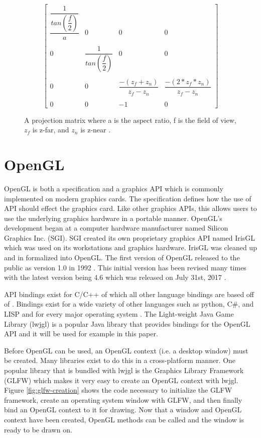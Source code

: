\documentclass{article}
\begin{document}
\begin{figure}[h]
    \[
	  \begin{bmatrix}
        \dfrac{\dfrac{1}{tan(\dfrac{f}{2})}}{a}  & 0 & 0 & 0 \\ \\
        0 & \dfrac{1}{tan(\dfrac{f}{2})} & 0 & 0 \\ \\
        0 & 0 & \dfrac{-(z_f + z_n)}{z_f - z_n} & \dfrac{-(2 * z_f * z_n)}{z_f - z_n} \\ \\
        0 & 0 & -1 & 0
      \end{bmatrix}
    \]
    \caption{A projection matrix where a is the aspect ratio, f is the field of view, $z_f$ is z-far, and $z_n$ is z-near \cite{hernandez2019}.}
    \label{fig:matrix}
\end{figure}

\section{OpenGL}
OpenGL is both a specification and a graphics API which is commonly implemented on modern graphics cards. The specification defines how the use of API should effect the graphics card. Like other graphics APIs, this allows users to use the underlying graphics hardware in a portable manner. OpenGL's development began at a computer hardware manufacturer named Silicon Graphics Inc. (SGI). SGI created its own proprietary graphics API named IrisGL which was used on its workstations and graphics hardware. IrisGL was cleaned up and in formalized into OpenGL. The first version of OpenGL released to the public as version 1.0 in 1992 \cite{openglwiki2018}. This initial version has been revised many times with the latest version being 4.6 which was released on July 31st, 2017 \cite{openglwiki2018}.

API bindings exist for C/C++ of which all other language bindings are based off of \cite{openglwiki2018}. Bindings exist for a wide variety of other languages such as python, C\#, and LISP and for every major operating system \cite{openglwiki2018}. The Light-weight Java Game Library (lwjgl) is a popular Java library that provides bindings for the OpenGL API and it will be used for example in this paper.

Before OpenGL can be used, an OpenGL context (i.e. a desktop window) must be created. Many libraries exist to do this in a cross-platform manner. One popular library that is bundled with lwjgl is the Graphics Library Framework (GLFW) which makes it very easy to create an OpenGL context with lwjgl. Figure \ref{fig:glfw-creation} shows the code necessary to initialize the GLFW framework, create an operating system window with GLFW, and then finally bind an OpenGL context to it for drawing. Now that a window and OpenGL context have been created, OpenGL methods can be called and the window is ready to be drawn on.
\end{document}
